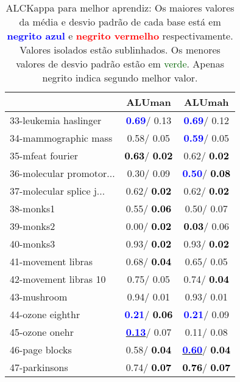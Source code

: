 \begin{table}[h]
\caption{ALCKappa para melhor aprendiz: Os maiores valores da média e desvio padrão de cada base está em \textcolor{blue}{\textbf{negrito azul}} e \textcolor{red}{\textbf{negrito vermelho}} respectivamente. Valores isolados estão sublinhados. Os menores valores de desvio padrão estão em \textcolor{darkgreen}{verde}. Apenas negrito indica segundo melhor valor.}
\begin{center}\begin{tabular}{lc|c}
 & ALUman & ALUmah\\ \hline 33-leukemia haslinger & \textcolor{blue}{\textbf{  0.69}}/  0.13 & \textcolor{blue}{\textbf{  0.69}}/  0.12 \\
34-mammographic mass &   0.58/  0.05 & \textcolor{blue}{\textbf{  0.59}}/  0.05 \\
35-mfeat fourier & \textcolor{black}{\textbf{  0.63}}/\textcolor{black}{\textbf{  0.02}} &   0.62/\textcolor{black}{\textbf{  0.02}} \\
36-molecular promotor... &   0.30/  0.09 & \textcolor{blue}{\textbf{  0.50}}/\textcolor{black}{\textbf{  0.08}} \\
37-molecular splice j... &   0.62/\textcolor{black}{\textbf{  0.02}} &   0.62/\textcolor{black}{\textbf{  0.02}} \\
38-monks1 &   0.55/\textcolor{black}{\textbf{  0.06}} &   0.50/  0.07 \\
39-monks2 &   0.00/\textcolor{black}{\textbf{  0.02}} & \textcolor{black}{\textbf{  0.03}}/  0.06 \\ \hline
40-monks3 &   0.93/\textcolor{black}{\textbf{  0.02}} &   0.93/\textcolor{black}{\textbf{  0.02}} \\
41-movement libras &   0.68/\textcolor{black}{\textbf{  0.04}} &   0.65/  0.05 \\
42-movement libras 10 &   0.75/  0.05 &   0.74/\textcolor{black}{\textbf{  0.04}} \\
43-mushroom &   0.94/  0.01 &   0.93/  0.01 \\
44-ozone eighthr & \textcolor{blue}{\textbf{  0.21}}/\textcolor{black}{\textbf{  0.06}} & \textcolor{blue}{\textbf{  0.21}}/  0.09 \\
45-ozone onehr & \underline{\textcolor{blue}{\textbf{  0.13}}}/  0.07 &   0.11/  0.08 \\
46-page blocks &   0.58/\textcolor{black}{\textbf{  0.04}} & \underline{\textcolor{blue}{\textbf{  0.60}}}/\textcolor{black}{\textbf{  0.04}} \\ \hline
47-parkinsons &   0.74/\textcolor{black}{\textbf{  0.07}} & \textcolor{black}{\textbf{  0.76}}/\textcolor{black}{\textbf{  0.07}} \\

\end{tabular}
\end{center}
\end{table}
